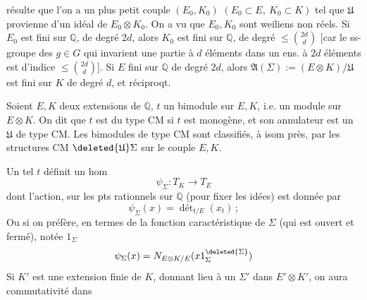 résulte que l'on a un plus petit couple $(E_0,K_0)$ $(E_0\subset E,\ K_0\subset K)$
tel que $\mathfrak U$ provienne d'un idéal de $E_0\otimes K_0$.
On a vu que $E_0,K_0$ sont weiliens non réels. Si $E_0$ est fini sur $\mathbb Q$,
de degré $2d$, alors $K_0$ est fini sur $\mathbb Q$, de degré $\leq\binom{2d}{d}$
[car le ss-groupe des $g\in G$ qui invarient une partie à $d$ éléments
dans un ens. à $2d$ éléments est d'indice $\leq\binom{2d}{d}$].
 Si $E$ fini sur $\mathbb Q$ de degré $2d$, alors
$\mathfrak A(\Sigma):=(E\otimes K)/\mathfrak U$ est fini sur $K$ de degré $d$,
et réciproqt.

Soient $E,K$ deux extensions de $\mathbb Q$, $t$ un bimodule sur $E,K$, i.e. un module
sur $E\otimes K$. On dit que $t$ est du type CM si $t$ est monogène, et son annulateur
est un $\mathfrak U$ de type CM. Les bimodules de type CM  sont
classifiés, à isom près, par les structures CM $\deleted{\mathfrak U}\Sigma$ sur le couple $E,K$.

Un tel $t$ définit 
un hom
\[
\psi_\Sigma:T_K\longrightarrow T_E
\]
dont l'action, sur les pts rationnels sur $\mathbb Q$ (pour fixer les idées) est donnée par
\[
\psi_\Sigma(x)=\operatorname{dét}_{t/E}(x_t)\,;
\]
Ou si on préfère, en termes de la fonction caractéristique de $\Sigma$
(qui est ouvert et fermé), notée  $1_\Sigma$
\[
\psi_\Sigma(x)=N_{E\otimes K/E}(x1_\Sigma^{\deleted{\Sigma}})
\]
Si $K'$ est une extension finie de $K$, 
donnant lieu à un $\Sigma'$ dans $E'\otimes K'$, on aura commutativité dans

